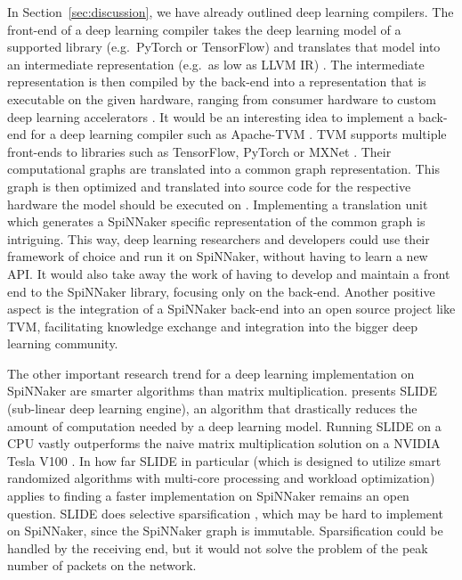 \documentclass[]{article}
\begin{document}
In Section~\ref{sec:discussion}, we have already outlined deep
learning compilers.
The front-end of a deep learning compiler takes the deep learning
model of a supported library (e.g.\ PyTorch or TensorFlow) and
translates that model into an intermediate representation (e.g.\
as low as LLVM IR) \citep{li_et_al_2020}.
The intermediate representation is then compiled by the back-end into
a representation that is executable on the given hardware, ranging
from consumer hardware to custom deep learning accelerators
\citep{li_et_al_2020}.
It would be an interesting idea to implement a back-end for a
deep learning compiler such as Apache-TVM \citep{chen_et_al_2018}.
TVM supports multiple front-ends to libraries such as TensorFlow,
PyTorch or MXNet \citep{chen_et_al_2015, chen_et_al_2018}.
Their computational graphs are translated into a common graph
representation.
This graph is then optimized and translated into source code for
the respective hardware the model should be executed on
\citep{chen_et_al_2018}.
Implementing a translation unit which generates a SpiNNaker specific
representation of the common graph is intriguing.
This way, deep learning researchers and developers could use their
framework of choice and run it on SpiNNaker, without having to
learn a new API.
It would also take away the work of having to develop and maintain
a front end to the SpiNNaker library, focusing only on the back-end.
Another positive aspect is the integration of a SpiNNaker back-end
into an open source project like TVM, facilitating knowledge exchange
and integration into the bigger deep learning community.

The other important research trend for a deep learning implementation
on  SpiNNaker are smarter algorithms than matrix multiplication.
\citet{chen_et_al_2019} presents SLIDE (sub-linear deep learning
engine), an algorithm that drastically reduces the amount of
computation needed by a deep learning model.
Running SLIDE on a CPU vastly outperforms the naive matrix
multiplication solution on a NVIDIA Tesla V100
\citep{chen_et_al_2019}.
In how far SLIDE in particular (which is designed to utilize smart
randomized algorithms with multi-core processing and workload
optimization) applies to finding a faster implementation on SpiNNaker
remains an open question.
SLIDE does selective sparsification
\citep{chen_et_al_2019, blanc_et_al_2018}, which may be hard to
implement on SpiNNaker, since the SpiNNaker graph is immutable.
Sparsification could be handled by the receiving end, but it would
not solve the problem of the peak number of packets on the
network.
\end{document}

